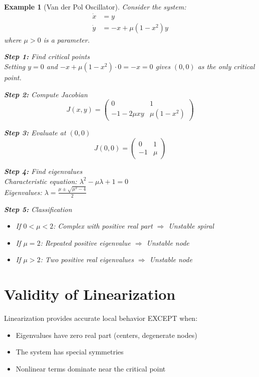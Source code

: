\documentclass[12pt]{article}
\newtheorem{example}{Example}
\begin{document}
\begin{example}[Van der Pol Oscillator]
Consider the system:
\begin{align}
\dot{x} &= y \\
\dot{y} &= -x + \mu(1-x^2)y
\end{align}
where $\mu > 0$ is a parameter.

\textbf{Step 1:} Find critical points\\
Setting $y = 0$ and $-x + \mu(1-x^2) \cdot 0 = -x = 0$ gives $(0,0)$ as the only critical point.

\textbf{Step 2:} Compute Jacobian
$$J(x,y) = \begin{pmatrix} 0 & 1 \\ -1 - 2\mu xy & \mu(1-x^2) \end{pmatrix}$$

\textbf{Step 3:} Evaluate at $(0,0)$
$$J(0,0) = \begin{pmatrix} 0 & 1 \\ -1 & \mu \end{pmatrix}$$

\textbf{Step 4:} Find eigenvalues\\
Characteristic equation: $\lambda^2 - \mu\lambda + 1 = 0$\\
Eigenvalues: $\lambda = \frac{\mu \pm \sqrt{\mu^2 - 4}}{2}$

\textbf{Step 5:} Classification
\begin{itemize}
    \item If $0 < \mu < 2$: Complex with positive real part $\Rightarrow$ Unstable spiral
    \item If $\mu = 2$: Repeated positive eigenvalue $\Rightarrow$ Unstable node
    \item If $\mu > 2$: Two positive real eigenvalues $\Rightarrow$ Unstable node
\end{itemize}
\end{example}

\section{Validity of Linearization}

\begin{warning}
Linearization provides accurate local behavior EXCEPT when:
\begin{itemize}
    \item Eigenvalues have zero real part (centers, degenerate nodes)
    \item The system has special symmetries
    \item Nonlinear terms dominate near the critical point
\end{itemize}
\end{warning}
\end{document}
